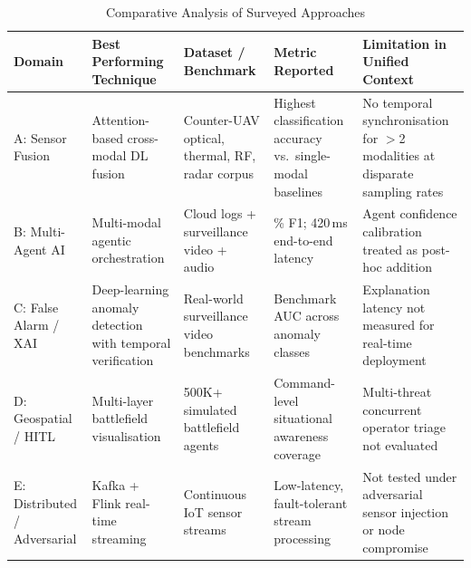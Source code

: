 \begin{table}[!t]
\centering
\caption{Comparative Analysis of Surveyed Approaches}
\label{tab:comparative}
\renewcommand{\arraystretch}{1.3}
\footnotesize
\begin{tabular}{>{\raggedright\arraybackslash}p{1.5cm}>{\raggedright\arraybackslash}p{3.2cm}>{\raggedright\arraybackslash}p{3.0cm}>{\raggedright\arraybackslash}p{2.8cm}>{\raggedright\arraybackslash}p{3.5cm}}
\hline
\textbf{Domain} & \textbf{Best Performing Technique} & \textbf{Dataset / Benchmark} & \textbf{Metric Reported} & \textbf{Limitation in Unified Context} \\
\hline
A: Sensor Fusion
  & Attention-based cross-modal DL fusion
  & Counter-UAV optical, thermal, RF, radar corpus
  & Highest classification accuracy vs.\ single-modal baselines
  & No temporal synchronisation for $>$2 modalities at disparate sampling rates \\
\hline
B: Multi-Agent AI
  & Multi-modal agentic orchestration
  & Cloud logs + surveillance video + audio
  & 96.2\% F1; 420\,ms end-to-end latency
  & Agent confidence calibration treated as post-hoc addition \\
\hline
C: False Alarm / XAI
  & Deep-learning anomaly detection with temporal verification
  & Real-world surveillance video benchmarks
  & Benchmark AUC across anomaly classes
  & Explanation latency not measured for real-time deployment \\
\hline
D: Geospatial / HITL
  & Multi-layer battlefield visualisation
  & 500K+ simulated battlefield agents
  & Command-level situational awareness coverage
  & Multi-threat concurrent operator triage not evaluated \\
\hline
E: Distributed / Adversarial
  & Kafka + Flink real-time streaming
  & Continuous IoT sensor streams
  & Low-latency, fault-tolerant stream processing
  & Not tested under adversarial sensor injection or node compromise \\
\hline
\end{tabular}
\end{table}
